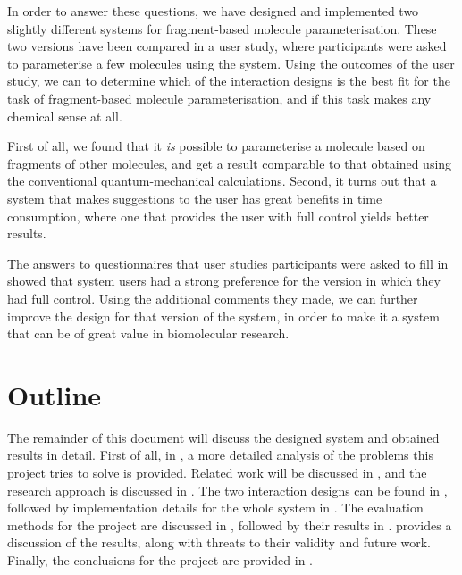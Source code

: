 In order to answer these questions, we have designed and implemented two slightly different systems for fragment-based molecule parameterisation. These two versions have been compared in a user study, where participants were asked to parameterise a few molecules using the system. Using the outcomes of the user study, we can to determine which of the interaction designs is the best fit for the task of fragment-based molecule parameterisation, and if this task makes any chemical sense at all.

First of all, we found that it \emph{is} possible to parameterise a molecule based on fragments of other molecules, and get a result comparable to that obtained using the conventional quantum-mechanical calculations. Second, it turns out that a system that makes suggestions to the user has great benefits in time consumption, where one that provides the user with full control yields better results.

The answers to questionnaires that user studies participants were asked to fill in showed that system users had a strong preference for the version in which they had full control. Using the additional comments they made, we can further improve the design for that version of the system, in order to make it a system that can be of great value in biomolecular research.

\section{Outline}
The remainder of this document will discuss the designed system and obtained results in detail. First of all, in , a more detailed analysis of the problems this project tries to solve is provided. Related work will be discussed in , and the research approach is discussed in . The two interaction designs can be found in , followed by implementation details for the whole system in . The evaluation methods for the project are discussed in , followed by their results in .  provides a discussion of the results, along with threats to their validity and future work. Finally, the conclusions for the project are provided in .
